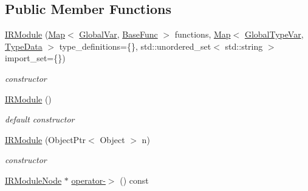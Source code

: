 \subsection*{Public Member Functions}
\begin{DoxyCompactItemize}
\item 
\hyperlink{classtvm_1_1IRModule_a53828dbf85c0755eb80ad794f5aa07c5}{I\+R\+Module} (\hyperlink{classtvm_1_1Map}{Map}$<$ \hyperlink{classtvm_1_1GlobalVar}{Global\+Var}, \hyperlink{classtvm_1_1BaseFunc}{Base\+Func} $>$ functions, \hyperlink{classtvm_1_1Map}{Map}$<$ \hyperlink{classtvm_1_1GlobalTypeVar}{Global\+Type\+Var}, \hyperlink{classtvm_1_1TypeData}{Type\+Data} $>$ type\+\_\+definitions=\{\}, std\+::unordered\+\_\+set$<$ std\+::string $>$ import\+\_\+set=\{\})
\begin{DoxyCompactList}\small\item\em constructor \end{DoxyCompactList}\item 
\hyperlink{classtvm_1_1IRModule_ad48ab78dc0e686cd722e2b677ccaa396}{I\+R\+Module} ()
\begin{DoxyCompactList}\small\item\em default constructor \end{DoxyCompactList}\item 
\hyperlink{classtvm_1_1IRModule_a69a94bf1f2e54191598b2271443d2696}{I\+R\+Module} (Object\+Ptr$<$ Object $>$ n)
\begin{DoxyCompactList}\small\item\em constructor \end{DoxyCompactList}\item 
\hyperlink{classtvm_1_1IRModuleNode}{I\+R\+Module\+Node} $\ast$ \hyperlink{classtvm_1_1IRModule_aff20748321d5b23f6e2ed5c558b026e2}{operator-\/$>$} () const 
\end{DoxyCompactItemize}
